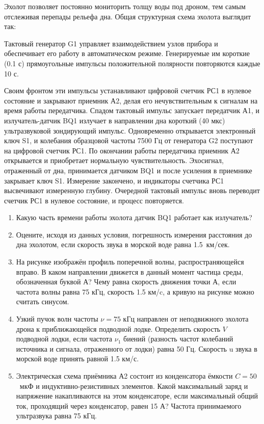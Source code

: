 
Эхолот позволяет постоянно мониторить толщу воды под дроном, тем самым отслеживая перепады рельефа дна. Общая структурная схема эхолота выглядит так:


Тактовый генератор G1 управляет взаимодействием узлов прибора и обеспечивает его работу в автоматическом режиме. 
Генерируемые им короткие (0.1 с) прямоугольные импульсы положительной полярности повторяются каждые 10 с.

Своим фронтом эти импульсы устанавливают цифровой счетчик РС1 в нулевое состояние и закрывают приемник А2, 
делая его нечувствительным к сигналам на время работы передатчика. Спадом тактовый импульс запускает передатчик 
А1, и излучатель-датчик BQ1 излучает в направлении дна короткий (40 мкс) ультразвуковой зондирующий импульс. 
Одновременно открывается электронный ключ S1, и колебания образцовой частоты 7500 Гц от генератора G2 поступают 
на цифровой счетчик РС1. По окончании работы передатчика приемник А2 открывается и приобретает нормальную 
чувствительность. Эхосигнал, отраженный от дна, принимается датчиком BQ1 и после усиления в приемнике 
закрывает ключ S1. Измерение закончено, и индикаторы счетчика РС1 высвечивают измеренную глубину. Очередной 
тактовый импульс вновь переводит счетчик РС1 в нулевое состояние, и процесс повторяется.

\begin{enumerate}
    \item Какую часть времени работы эхолота датчик BQ1 работает как излучатель?
    \item Оцените, исходя из данных условия, погрешность измерения расстояния до дна эхолотом, если скорость звука в морской воде равна 1.5~км/сек. 
    \item На рисунке изображён профиль поперечной волны, распространяющейся вправо. В каком направлении 
    движется в данный момент частица среды, обозначенная буквой А? Чему равна скорость движения точки А, если 
    частота волны равна 75 кГц, скорость 1.5 км/c, а кривую на рисунке можно считать синусом.
    

    \item Узкий пучок волн частоты $\nu = 75$ кГц направлен от неподвижного эхолота дрона к приближающейся подводной лодке. 
    Определить скорость $V$ подводной лодки, если частота $\nu_1$ биений (разность частот колебаний источника и сигнала, 
    отраженного от лодки) равна 50 Гц. Скорость u звука в морской воде принять равной 1.5 км/с.
    \item Электрическая схема приёмника А2 состоит из конденсатора ёмкости \linebreak $C = 50$~мкФ и 
    индуктивно-резистивных элементов. Какой максимальный заряд и напряжение накапливаются на 
    этом конденсаторе, если максимальный общий ток, проходящий через конденсатор, равен 15 А? 
    Частота принимаемого ультразвука равна 75 кГц.
    
\end{enumerate}